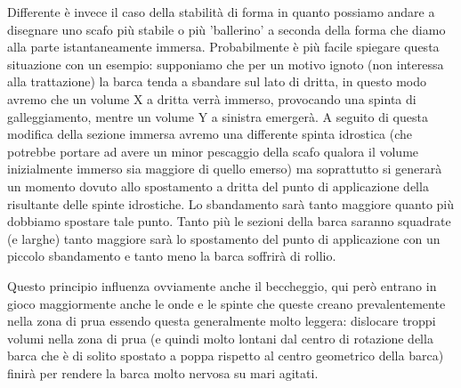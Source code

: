 Differente è invece il caso della stabilità di forma in quanto possiamo andare a disegnare uno scafo più stabile o più 'ballerino' a seconda della forma che diamo alla parte istantaneamente immersa. Probabilmente è più facile spiegare questa situazione con un esempio: supponiamo che per un motivo ignoto (non interessa alla trattazione) la barca tenda a sbandare sul lato di dritta, in questo modo avremo che un volume X a dritta verrà immerso, provocando una spinta di galleggiamento, mentre un volume Y a sinistra emergerà.
A seguito di questa modifica della sezione immersa avremo una differente spinta idrostica (che potrebbe portare ad avere un minor pescaggio della scafo qualora il volume inizialmente immerso sia maggiore di quello emerso) ma soprattutto si generarà un momento dovuto allo spostamento a dritta del punto di applicazione della risultante delle spinte idrostiche. Lo sbandamento sarà tanto maggiore quanto più dobbiamo spostare tale punto.
Tanto più le sezioni della barca saranno squadrate (e larghe) tanto maggiore sarà lo spostamento del punto di applicazione con un piccolo sbandamento e tanto meno la barca soffrirà di rollio.

Questo principio influenza ovviamente anche il beccheggio, qui però entrano in gioco maggiormente anche le onde e le spinte che queste creano prevalentemente nella zona di prua essendo questa generalmente molto leggera: dislocare troppi volumi nella zona di prua (e quindi molto lontani dal centro di rotazione della barca che è di solito spostato a poppa rispetto al centro geometrico della barca) finirà per rendere la barca molto nervosa su mari agitati.